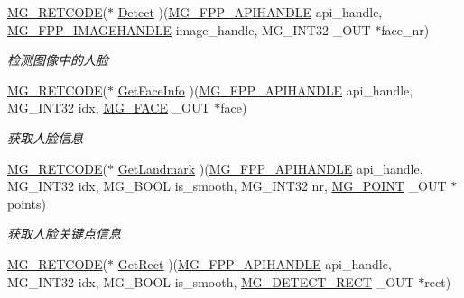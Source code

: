 \begin{DoxyCompactItemize}
\hyperlink{_m_g___common_8h_a38fecb61b8c39592ddb51f75d4a5c5e7}{M\+G\+\_\+\+R\+E\+T\+C\+O\+DE}($\ast$ \hyperlink{struct_m_g___f_a_c_e_p_p___a_p_i___f_u_n_c_t_i_o_n_s___t_y_p_e_aa548373446fe877be6a50973e7178702}{Detect} )(\hyperlink{_m_g___facepp_8h_ada15f635ef909e9aca52824dd580da40}{M\+G\+\_\+\+F\+P\+P\+\_\+\+A\+P\+I\+H\+A\+N\+D\+LE} api\+\_\+handle, \hyperlink{_m_g___facepp_8h_a3492210206745444514ed588709ea666}{M\+G\+\_\+\+F\+P\+P\+\_\+\+I\+M\+A\+G\+E\+H\+A\+N\+D\+LE} image\+\_\+handle, M\+G\+\_\+\+I\+N\+T32 \+\_\+\+O\+UT $\ast$face\+\_\+nr)
\begin{DoxyCompactList}\small\item\em 检测图像中的人脸 \end{DoxyCompactList}\item 
\hyperlink{_m_g___common_8h_a38fecb61b8c39592ddb51f75d4a5c5e7}{M\+G\+\_\+\+R\+E\+T\+C\+O\+DE}($\ast$ \hyperlink{struct_m_g___f_a_c_e_p_p___a_p_i___f_u_n_c_t_i_o_n_s___t_y_p_e_add105d08334445cdbe3804e14ed87fe3}{Get\+Face\+Info} )(\hyperlink{_m_g___facepp_8h_ada15f635ef909e9aca52824dd580da40}{M\+G\+\_\+\+F\+P\+P\+\_\+\+A\+P\+I\+H\+A\+N\+D\+LE} api\+\_\+handle, M\+G\+\_\+\+I\+N\+T32 idx, \hyperlink{struct_m_g___f_a_c_e}{M\+G\+\_\+\+F\+A\+CE} \+\_\+\+O\+UT $\ast$face)
\begin{DoxyCompactList}\small\item\em 获取人脸信息 \end{DoxyCompactList}\item 
\hyperlink{_m_g___common_8h_a38fecb61b8c39592ddb51f75d4a5c5e7}{M\+G\+\_\+\+R\+E\+T\+C\+O\+DE}($\ast$ \hyperlink{struct_m_g___f_a_c_e_p_p___a_p_i___f_u_n_c_t_i_o_n_s___t_y_p_e_a116f91f24bb127f395deb45e9a4f4c73}{Get\+Landmark} )(\hyperlink{_m_g___facepp_8h_ada15f635ef909e9aca52824dd580da40}{M\+G\+\_\+\+F\+P\+P\+\_\+\+A\+P\+I\+H\+A\+N\+D\+LE} api\+\_\+handle, M\+G\+\_\+\+I\+N\+T32 idx, M\+G\+\_\+\+B\+O\+OL is\+\_\+smooth, M\+G\+\_\+\+I\+N\+T32 nr, \hyperlink{struct_m_g___p_o_i_n_t}{M\+G\+\_\+\+P\+O\+I\+NT} \+\_\+\+O\+UT $\ast$points)
\begin{DoxyCompactList}\small\item\em 获取人脸关键点信息 \end{DoxyCompactList}\item 
\hyperlink{_m_g___common_8h_a38fecb61b8c39592ddb51f75d4a5c5e7}{M\+G\+\_\+\+R\+E\+T\+C\+O\+DE}($\ast$ \hyperlink{struct_m_g___f_a_c_e_p_p___a_p_i___f_u_n_c_t_i_o_n_s___t_y_p_e_a1c21a2f447a69abb3a99c73e82b27b10}{Get\+Rect} )(\hyperlink{_m_g___facepp_8h_ada15f635ef909e9aca52824dd580da40}{M\+G\+\_\+\+F\+P\+P\+\_\+\+A\+P\+I\+H\+A\+N\+D\+LE} api\+\_\+handle, M\+G\+\_\+\+I\+N\+T32 idx, M\+G\+\_\+\+B\+O\+OL is\+\_\+smooth, \hyperlink{struct_m_g___d_e_t_e_c_t___r_e_c_t}{M\+G\+\_\+\+D\+E\+T\+E\+C\+T\+\_\+\+R\+E\+CT} \+\_\+\+O\+UT $\ast$rect)

\end{DoxyCompactItemize}
